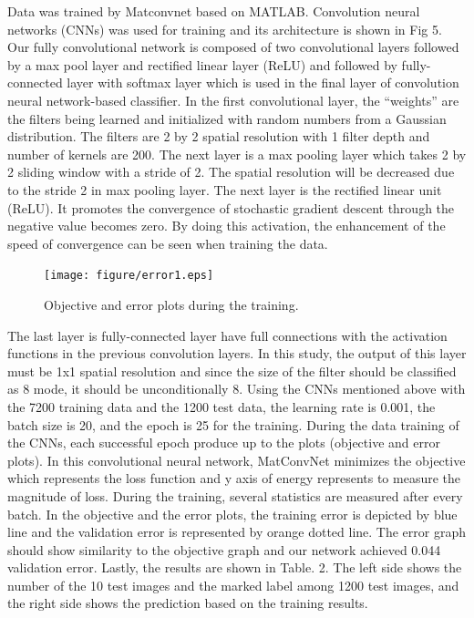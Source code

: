 Data was trained by Matconvnet based on MATLAB. Convolution neural networks (CNNs) was used for training and its architecture is shown in Fig 5. Our fully convolutional network is composed of two convolutional layers followed by a max pool layer and rectified linear layer (ReLU) and followed by fully-connected layer with softmax layer which is used in the final layer of convolution neural network-based classifier. In the first convolutional layer, the “weights” are the filters being learned and initialized with random numbers from a Gaussian distribution. The filters are 2 by 2 spatial resolution with 1 filter depth and number of kernels are 200. The next layer is a max pooling layer which takes 2 by 2 sliding window with a stride of 2. The spatial resolution will be decreased due to the stride 2 in max pooling layer. The next layer is the rectified linear unit (ReLU). It promotes the convergence of stochastic gradient descent through the negative value becomes zero. By doing this activation, the enhancement of the speed of convergence can be seen when training the data. 
\label{subsubsec3}
\begin{figure}
\centering
\texttt{[image: figure/error1.eps]}
\caption{Objective and error plots during the training.}
\label{fig:5}       
\end{figure}
The last layer is fully-connected layer have full connections with the activation functions in the previous convolution layers. In this study, the output of this layer must be 1x1 spatial resolution and since the size of the filter should be classified as 8 mode, it should be unconditionally 8. Using the CNNs mentioned above with the 7200 training data and the 1200 test data, the learning rate is 0.001, the batch size is 20, and the epoch is 25 for the training. 
During the data training of the CNNs, each successful epoch produce up to the plots (objective and error plots). In this convolutional neural network, MatConvNet minimizes the objective which represents the loss function and y axis of energy represents to measure the magnitude of loss. During the training, several statistics are measured after every batch. In the objective and the error plots, the training error is depicted by blue line and the validation error is represented by orange dotted line. The error graph should show similarity to the objective graph and our network achieved 0.044 validation error. Lastly, the results are shown in Table. 2. The left side shows the number of the 10 test images and the marked label among 1200 test images, and the right side shows the prediction based on the training results.
